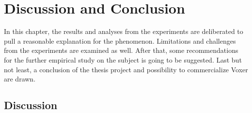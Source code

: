 
\chapter{Discussion and Conclusion}

In this chapter, the results and analyses from the experiments are deliberated to pull a reasonable explanation for the phenomenon. Limitations and challenges from the experiments are examined as well. After that, some recommendations for the further empirical study on the subject is going to be suggested. Last but not least, a conclusion of the thesis project and possibility to commercialize Voxer are drawn.

\section{Discussion}

